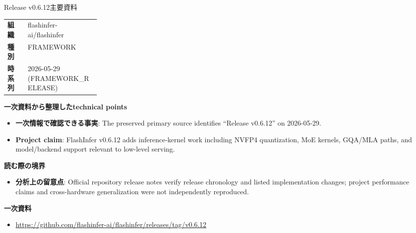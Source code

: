\begin{technicalnote}{Release v0.6.12}{主要資料}
\begin{tabularx}{\linewidth}{@{}>{\bfseries}p{0.22\linewidth}X@{}}
組織 & flashinfer-ai/flashinfer \\
種別 & FRAMEWORK \\
時系列 & 2026-05-29 (FRAMEWORK\_RELEASE) \\
\end{tabularx}
\smallskip
{\bfseries 一次資料から整理したtechnical points}
\begin{itemize}[leftmargin=1.5em,itemsep=0.35em]
\item \textbf{一次情報で確認できる事実}: The preserved primary source identifies “Release v0.6.12” on 2026-05-29.
\item \textbf{Project claim}: FlashInfer v0.6.12 adds inference-kernel work including NVFP4 quantization, MoE kernels, GQA/MLA paths, and model/backend support relevant to low-level serving.
\end{itemize}
{\bfseries 読む際の境界}
\begin{itemize}[leftmargin=1.5em,itemsep=0.35em]
\item \textbf{分析上の留意点}: Official repository release notes verify release chronology and listed implementation changes; project performance claims and cross-hardware generalization were not independently reproduced.
\end{itemize}
{\bfseries 一次資料}
\begingroup\sloppy
\begin{itemize}[leftmargin=1.5em,itemsep=0.25em]
\item {\scriptsize\url{https://github.com/flashinfer-ai/flashinfer/releases/tag/v0.6.12}}
\end{itemize}
\endgroup
\end{technicalnote}
\medskip

